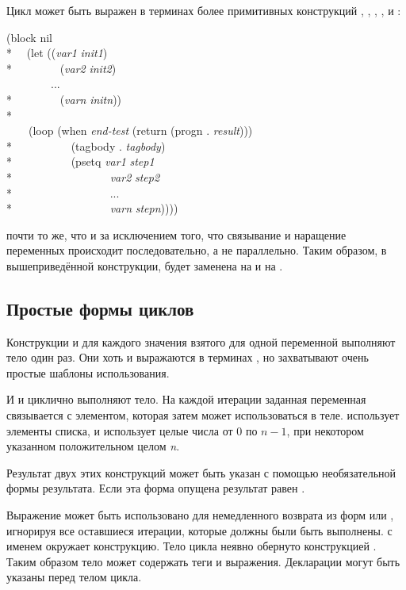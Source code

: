 \begin{defmac}
Цикл  может быть выражен в терминах более примитивных конструкций 
, , , , 
и :
\begin{lisp}
(block nil \\*
~~(let ((\emph{var1} \emph{init1}) \\*
~~~~~~~~(\emph{var2} \emph{init2}) \\
~~~~~~~~... \\*
~~~~~~~~(\emph{varn} \emph{initn})) \\*
~~~~ \\
~~~~(loop (when \emph{end-test} (return (progn . \emph{result}))) \\*
~~~~~~~~~~(tagbody . \emph{tagbody}) \\*
~~~~~~~~~~(psetq \emph{var1} \emph{step1} \\*
~~~~~~~~~~~~~~~~~\emph{var2} \emph{step2} \\*
~~~~~~~~~~~~~~~~~... \\*
~~~~~~~~~~~~~~~~~\emph{varn} \emph{stepn}))))
\end{lisp}
 почти то же, что и  за исключением того, что связывание и
наращение переменных происходит последовательно, а не параллельно.
Таким образом, в вышеприведённой конструкции,  будет заменена на
 и  на .
\end{defmac}

\subsection{Простые формы циклов}

Конструкции  и  для каждого значения взятого для одной
переменной выполняют тело один раз. Они хоть и выражаются в терминах ,
но захватывают очень простые шаблоны использования.

И  и  циклично выполняют тело. На каждой итерации
заданная переменная связывается с элементом, которая затем может использоваться
в теле.  использует элементы списка, и  использует
целые числа от 0 по $n-1$, при некотором указанном положительном целом \emph{n}.

Результат двух этих конструкций может быть указан с помощью необязательной формы
результата. Если эта форма опущена результат равен {\false}.

Выражение  может быть использовано для немедленного возврата из форм
 или , игнорируя все оставшиеся итерации, которые
должны были быть выполнены.  с именем {\nil} окружает конструкцию.
Тело цикла неявно обернуто конструкцией .
Таким образом тело может содержать теги и  выражения.
Декларации могут быть указаны перед телом цикла.

